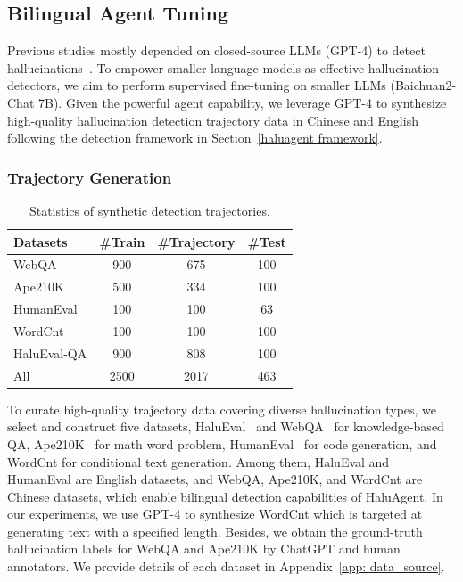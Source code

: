 \subsection{Bilingual Agent Tuning}

Previous studies mostly depended on closed-source LLMs (\eg GPT-4) to detect hallucinations~\cite{chern2023factool,wei2024long}. To empower smaller language models as effective hallucination detectors, we aim to perform supervised fine-tuning on smaller LLMs (\eg Baichuan2-Chat 7B). Given the powerful agent capability, we leverage GPT-4 to synthesize high-quality hallucination detection trajectory data in Chinese and English following the detection framework in Section~\ref{haluagent framework}. 


\subsubsection{Trajectory Generation}



\begin{table}[tb]
\centering
\small
\begin{tabular}{l|ccc}
\toprule
Datasets  & \#Train & \#Trajectory & \#Test \\
\midrule
WebQA & 900 & 675 & 100 \\
Ape210K & 500 & 334 & 100 \\
HumanEval & 100 & 100 & 63 \\
WordCnt & 100 & 100 & 100 \\
HaluEval-QA & 900 & 808 & 100 \\
\midrule
All & 2500 & 2017 & 463 \\
\bottomrule
\end{tabular}
\caption{Statistics of synthetic detection trajectories.}
\vspace{-0.3cm}
\label{tab: trajectory statistics}
\end{table}



\label{sec: in-domain dataset}
To curate high-quality trajectory data covering diverse hallucination types, we select and construct five datasets, \ie HaluEval~\cite{li2023halueval} and WebQA~\cite{li2016dataset} for knowledge-based QA, Ape210K~\cite{zhao2020ape210k} for math word problem, HumanEval~\cite{chen2021evaluating} for code generation, and WordCnt for conditional text generation. Among them, HaluEval and HumanEval are English datasets, and WebQA, Ape210K, and WordCnt are Chinese datasets, which enable bilingual detection capabilities of HaluAgent. In our experiments, we use GPT-4 to synthesize WordCnt which is targeted at generating text with a specified length. Besides, we obtain the ground-truth hallucination labels for WebQA and Ape210K by ChatGPT and human annotators.
We provide details of each dataset in Appendix~\ref{app: data_source}.




